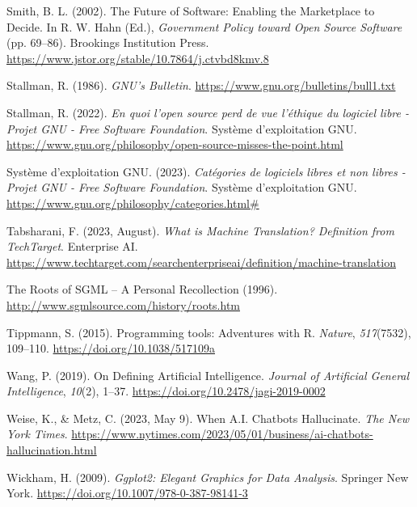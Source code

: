 \documentclass[
  letterpaper,
  DIV=11,
  numbers=noendperiod]{scrreprt}
\newlength{\cslhangindent}
\newlength{\cslentryspacingunit} %
\newenvironment{CSLReferences}[2] %
 {%
  \setlength{\parindent}{0pt}
  \ifodd #1
  \let\oldpar\par
  \def\par{\hangindent=\cslhangindent\oldpar}
  \fi
  \setlength{\parskip}{#2\cslentryspacingunit}
 }%
 {}
\begin{document}
\begin{CSLReferences}{1}{0}
\leavevmode{}%
Smith, B. L. (2002). The {Future} of {Software}: {Enabling} the
{Marketplace} to {Decide}. In R. W. Hahn (Ed.), \emph{Government
{Policy} toward {Open Source Software}} (pp. 69--86). Brookings
Institution Press.
\url{https://www.jstor.org/stable/10.7864/j.ctvbd8kmv.8}

\leavevmode{}%
Stallman, R. (1986). \emph{{GNU}'s {Bulletin}}.
\url{https://www.gnu.org/bulletins/bull1.txt}

\leavevmode{}%
Stallman, R. (2022). \emph{En quoi l'open source perd de vue l'éthique
du logiciel libre - {Projet GNU} - {Free Software Foundation}}. Système
d'exploitation GNU.
\url{https://www.gnu.org/philosophy/open-source-misses-the-point.html}

\leavevmode{}%
Système d'exploitation GNU. (2023). \emph{Catégories de logiciels libres
et non libres - {Projet GNU} - {Free Software Foundation}}. Système
d'exploitation GNU.
\url{https://www.gnu.org/philosophy/categories.html\#}

\leavevmode{}%
Tabsharani, F. (2023, August). \emph{What is {Machine Translation}?
{Definition} from {TechTarget}}. Enterprise AI.
\url{https://www.techtarget.com/searchenterpriseai/definition/machine-translation}

\leavevmode{}%
The {Roots} of {SGML} -- {A Personal Recollection} (1996).
\url{http://www.sgmlsource.com/history/roots.htm}

\leavevmode{}%
Tippmann, S. (2015). Programming tools: {Adventures} with {R}.
\emph{Nature}, \emph{517}(7532), 109--110.
\url{https://doi.org/10.1038/517109a}

\leavevmode{}%
Wang, P. (2019). On {Defining Artificial Intelligence}. \emph{Journal of
Artificial General Intelligence}, \emph{10}(2), 1--37.
\url{https://doi.org/10.2478/jagi-2019-0002}

\leavevmode{}%
Weise, K., \& Metz, C. (2023, May 9). When {A}.{I}. {Chatbots
Hallucinate}. \emph{The New York Times}.
\url{https://www.nytimes.com/2023/05/01/business/ai-chatbots-hallucination.html}

\leavevmode{}%
Wickham, H. (2009). \emph{Ggplot2: {Elegant Graphics} for {Data
Analysis}}. Springer New York.
\url{https://doi.org/10.1007/978-0-387-98141-3}


\end{CSLReferences}
\end{document}
